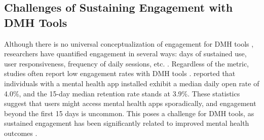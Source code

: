 \subsection{Challenges of Sustaining Engagement with DMH Tools}




Although there is no universal conceptualization of engagement for DMH tools \cite{zech2023integrative}, researchers have quantified engagement in several ways: days of sustained use, user responsiveness, frequency of daily sessions, etc. \cite{lipschitz2023engagement, wang2023metrics}. Regardless of the metric, studies often report low engagement rates with DMH tools \cite{baumel2019objective, lipschitz2023engagement}. \citet{baumel2019objective} reported that individuals with a mental health app installed exhibit a median daily open rate of 4.0\%, and the 15-day median retention rate stands at  3.9\%. These statistics suggest that users might access mental health apps sporadically, and engagement beyond the first 15 days is uncommon. This poses a challenge for DMH tools, as sustained engagement has been significantly related to improved mental health outcomes \cite{gan2021effect}.


